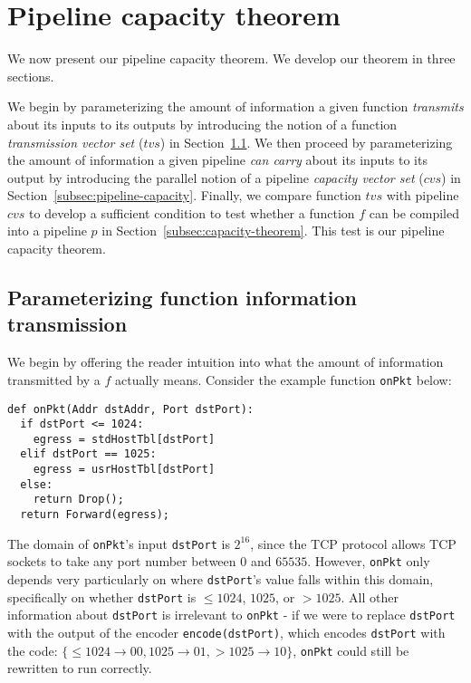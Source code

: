 \section{Pipeline capacity theorem}
\label{sec:pipeline-capacity-theorem}
We now present our pipeline capacity theorem. We develop our theorem in three sections.

We begin by parameterizing the amount of information a given function \textit{transmits} about its inputs to its outputs by introducing the notion of a function \textit{transmission vector set} ($tvs$) in Section~\ref{subsec:function-transmission}. We then proceed by parameterizing the amount of information a given pipeline \textit{can carry} about its inputs to its output by introducing the parallel notion of a pipeline \textit{capacity vector set} ($cvs$) in Section~\ref{subsec:pipeline-capacity}. Finally, we compare function $tvs$ with pipeline $cvs$ to develop a sufficient condition to test whether a function $f$ can be compiled into a pipeline $p$ in Section~\ref{subsec:capacity-theorem}. This test is our pipeline capacity theorem.

\subsection{Parameterizing function information transmission}
\label{subsec:function-transmission}


 We begin by offering the reader intuition into what the amount of information transmitted by a $f$ actually means. Consider the example function \texttt{onPkt} below:

\begin{verbatim}
def onPkt(Addr dstAddr, Port dstPort):
  if dstPort <= 1024:
    egress = stdHostTbl[dstPort]
  elif dstPort == 1025:
    egress = usrHostTbl[dstPort]
  else:
    return Drop();
  return Forward(egress);
\end{verbatim}

The domain of \texttt{onPkt}'s input \texttt{dstPort} is $2^{16}$, since the TCP protocol allows TCP sockets to take any port number between $0$ and $65535$. However, \texttt{onPkt} only depends very particularly on where \texttt{dstPort}'s value falls within this domain, specifically on whether \texttt{dstPort} is $\leq 1024$, $1025$, or $> 1025$. All other information about \texttt{dstPort} is irrelevant to \texttt{onPkt} - if we were to replace \texttt{dstPort} with the output of the encoder \texttt{encode(dstPort)}, which encodes \texttt{dstPort} with the code: $\{\leq 1024 \rightarrow 00, 1025 \rightarrow 01, >1025 \rightarrow 10\}$, \texttt{onPkt} could still be rewritten to run correctly. 

